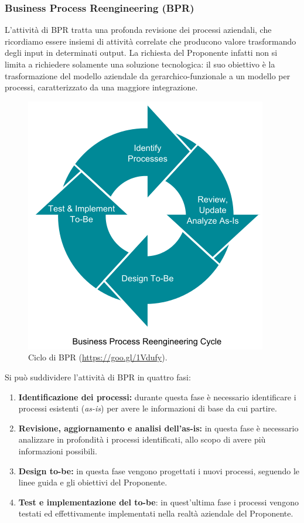             
            \subsubsection{Business Process Reengineering (BPR)}
				L'attività di BPR tratta una profonda revisione dei processi aziendali, che ricordiamo essere insiemi di attività correlate che producono valore trasformando degli input in determinati output. La richiesta del Proponente infatti non si limita a richiedere solamente una soluzione tecnologica: il suo obiettivo è la trasformazione del modello aziendale da gerarchico-funzionale a un modello per processi, caratterizzato da una maggiore integrazione.
                \begin{figure}[H]
                  	\centering
                  	\includegraphics[scale=0.4]{immagini/rollout/BPR}
                	\caption{Ciclo di BPR (\url{https://goo.gl/1Vdufy}).}
				\end{figure}
                Si può suddividere l'attività di BPR in quattro fasi:
                \begin{enumerate}
                	\item \textbf{Identificazione dei processi:} durante questa fase è necessario identificare i processi esistenti (\textit{as-is}) per avere le informazioni di base da cui partire.
                    \item \textbf{Revisione, aggiornamento e analisi dell'as-is:} in questa fase è necessario analizzare in profondità i processi identificati, allo scopo di avere più informazioni possibili.
                    \item \textbf{Design to-be:} in questa fase vengono progettati i nuovi processi, seguendo le linee guida e gli obiettivi del Proponente.
                    \item \textbf{Test e implementazione del to-be}: in quest'ultima fase i processi vengono testati ed effettivamente implementati nella realtà aziendale del Proponente.
                \end{enumerate}
                    
